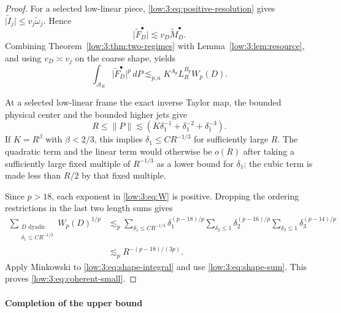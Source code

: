 \documentclass[11pt]{amsart}
\theoremstyle{definition}
\theoremstyle{remark}
\newcommand{\norm}[1]{\lVert #1\rVert}
\newcommand{\abs}[1]{\lvert #1\rvert}
\numberwithin{equation}{section}
\begin{document}
\begin{proof}
For a selected low-linear piece, \eqref{low:3:eq:positive-resolution} gives $\abs{\widetilde I_j}\leq v_j\widetilde\omega_j$. Hence
\[
\abs{\widetilde F_D^\bullet}\lesssim v_D\widetilde M_D^\bullet.
\]
Combining Theorem~\ref{low:3:thm:two-regimes} with Lemma~\ref{low:3:lem:resource}, and using $v_D\asymp v_j$ on the coarse shape, yields
\begin{equation}\label{low:3:eq:shape-integral}
\int_{\mathcal A_R}\abs{\widetilde F_D^\bullet}^p\,dP\lesssim_{p,a} K^{A_p}L_R^{B_p}W_p(D).
\end{equation}

At a selected low-linear frame the exact inverse Taylor map, the bounded physical center and the bounded higher jets give
\begin{equation}\label{low:3:eq:shortest-side}
R\leq\norm P\lesssim \left(K\delta_1^{-1}+\delta_1^{-2}+\delta_1^{-3}\right).
\end{equation}
If $K=R^\beta$ with $\beta<2/3$, this implies $\delta_1\leq C R^{-1/3}$ for sufficiently large $R$. The quadratic term and the linear term would otherwise be $o(R)$ after taking a sufficiently large fixed multiple of $R^{-1/3}$ as a lower bound for $\delta_1$; the cubic term is made less than $R/2$ by that fixed multiple.

Since $p>18$, each exponent in \eqref{low:3:eq:W} is positive. Dropping the ordering restrictions in the last two length sums gives
\begin{align}\label{low:3:eq:shape-sum}
\sum_{\substack{D\text{ dyadic}\\\delta_1\leq C R^{-1/3}}}W_p(D)^{1/p}
&\lesssim_p\sum_{\delta_1\leq C R^{-1/3}}\delta_1^{(p-18)/p}\sum_{\delta_2\leq1}\delta_2^{(p-16)/p}\sum_{\delta_3\leq1}\delta_3^{(p-14)/p}\\
&\lesssim_p R^{-(p-18)/(3p)}.\nonumber
\end{align}
Apply Minkowski to \eqref{low:3:eq:shape-integral} and use \eqref{low:3:eq:shape-sum}. This proves \eqref{low:3:eq:coherent-small}.
\end{proof}

\paragraph{Completion of the upper bound}
\end{document}

